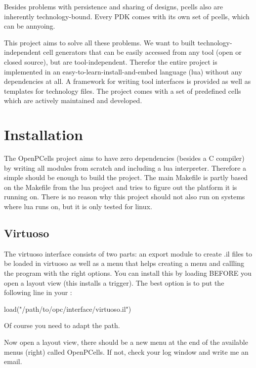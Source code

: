 Besides problems with persistence and sharing of designs, pcells also are inherently technology-bound.
Every PDK comes with its own set of pcells, which can be annyoing.

This project aims to solve all these problems.
We want to built technology-independent cell generators that can be easily accessed from any tool (open or closed source), but are tool-independent.
Therefor the entire project is implemented in an easy-to-learn-install-and-embed language (lua) without any dependencies at all.
A framework for writing tool interfaces is provided as well as templates for technology files.
The project comes with a set of predefined cells which are actively maintained and developed.

\section{Installation}
The OpenPCells project aims to have zero dependencies (besides a C compiler) by writing all modules from scratch and including a lua interpreter. Therefore a
simple  should be enough to build the project. The main Makefile is partly based on the Makefile from the lua project and tries to figure out
the platform it is running on. There is no reason why this project should not also run on systems where lua runs on, but it is only tested for linux.

\subsection{Virtuoso}
The virtuoso interface consists of two parts: an export module to create .il files to be loaded in virtuoso as well as a menu that helps creating a menu and
callling the program with the right options. You can install this by loading  BEFORE you open a layout view (this
installs a trigger). The best option is to put the following line in your :
\begin{shellcode}
    load("/path/to/opc/interface/virtuoso.il")
\end{shellcode}
Of course you need to adapt the path.

Now open a layout view, there should be a new menu at the end of the available menus (right) called OpenPCells. If not, check your log window and write me an
email.



